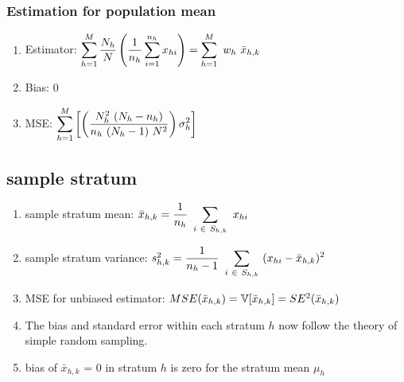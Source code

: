 \subsubsection{Estimation for population mean}
\begin{enumerate}
    \item Estimator: $
        \displaystyle\sum_{h=1}^{M}
        \dfrac{N_h}{N}
        \left(\dfrac{1}{n_h} \displaystyle\sum_{i=1}^{n_h} x_{hi}\right)
        =
        \displaystyle\sum_{h=1}^{M} \ w_h \ \bar{x}_{h,k}
    $
    \hfill \cite{statistics/book/Statistics-for-Data-Scientists/Maurits-Kaptein}

    \item Bias: $0$
    \hfill \cite{statistics/book/Statistics-for-Data-Scientists/Maurits-Kaptein}

    \item MSE: $
        \displaystyle\sum_{h=1}^{M}
        \left[
            \left(
                \dfrac{
                    N_h^2\ (N_h - n_h)
                }{
                    n_h\ (N_h-1)\ N^2
                }
            \right) \sigma_h^2
        \right]
    $
    \hfill \cite{statistics/book/Statistics-for-Data-Scientists/Maurits-Kaptein}
\end{enumerate}




\subsection{sample stratum}
\begin{enumerate}
    \item sample stratum mean: $
        \bar{x}_{h,k} = \dfrac{1}{n_h} \ \displaystyle\sum_{i \ \in \ S_{h,k}} \ x_{hi}
    $
    \hfill \cite{statistics/book/Statistics-for-Data-Scientists/Maurits-Kaptein}

    \item sample stratum variance: $
        s^2_{h,k} = \dfrac{1}{n_h-1} \ \displaystyle\sum_{i \ \in \ S_{h,k}} \ (x_{hi} - \bar{x}_{h,k})^2
    $
    \hfill \cite{statistics/book/Statistics-for-Data-Scientists/Maurits-Kaptein}

    \item MSE for unbiased estimator:
    $
        MSE(\bar{x}_{h,k}) = \mathbb{V}[\bar{x}_{h,k}] = SE^2(\bar{x}_{h,k})
    $
    \hfill \cite{common/online/chatgpt}

    \item The bias and standard error within each stratum $h$ now follow the theory of simple random sampling.
    \hfill \cite{statistics/book/Statistics-for-Data-Scientists/Maurits-Kaptein}

    \item bias of $\bar{x}_{h,k}$ = 0 in stratum $h$ is zero for the stratum mean $\mu_h$

\end{enumerate}


